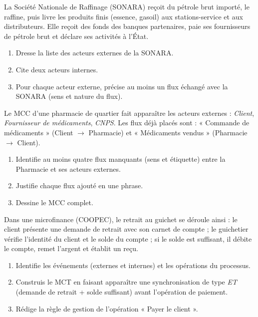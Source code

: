 \documentclass[11pt]{article}
\begin{document}
\begin{exercice}
La Société Nationale de Raffinage (SONARA) reçoit du pétrole brut importé, le raffine, puis livre les produits finis (essence, gasoil) aux stations-service et aux distributeurs. Elle reçoit des fonds des banques partenaires, paie ses fournisseurs de pétrole brut et déclare ses activités à l'État.
\begin{enumerate}
\item Dresse la liste des acteurs externes de la SONARA.
\item Cite deux acteurs internes.
\item Pour chaque acteur externe, précise au moins un flux échangé avec la SONARA (sens et nature du flux).
\end{enumerate}
\end{exercice}

\begin{exercice}
Le MCC d'une pharmacie de quartier fait apparaître les acteurs externes : \emph{Client}, \emph{Fournisseur de médicaments}, \emph{CNPS}. Les flux déjà placés sont : « Commande de médicaments » (Client $\rightarrow$ Pharmacie) et « Médicaments vendus » (Pharmacie $\rightarrow$ Client).
\begin{enumerate}
\item Identifie au moins quatre flux manquants (sens et étiquette) entre la Pharmacie et ses acteurs externes.
\item Justifie chaque flux ajouté en une phrase.
\item Dessine le MCC complet.
\end{enumerate}
\end{exercice}

\begin{exercice}
Dans une microfinance (COOPEC), le retrait au guichet se déroule ainsi : le client présente une demande de retrait avec son carnet de compte ; le guichetier vérifie l'identité du client et le solde du compte ; si le solde est suffisant, il débite le compte, remet l'argent et établit un reçu.
\begin{enumerate}
\item Identifie les événements (externes et internes) et les opérations du processus.
\item Construis le MCT en faisant apparaître une synchronisation de type \emph{ET} (demande de retrait + solde suffisant) avant l'opération de paiement.
\item Rédige la règle de gestion de l'opération « Payer le client ».
\end{enumerate}
\end{exercice}
\end{document}

